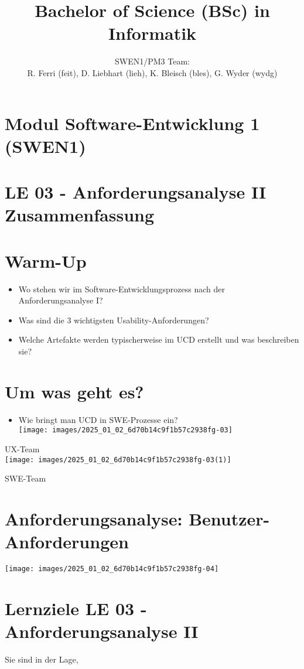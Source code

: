 \documentclass[10pt]{article}
\title{Bachelor of Science (BSc) in Informatik }
\author{SWEN1/PM3 Team:\\
R. Ferri (feit), D. Liebhart (lieh), K. Bleisch (bles), G. Wyder (wydg)}
\date{}
\begin{document}
\maketitle
\section*{Modul Software-Entwicklung 1 (SWEN1) }
\section*{LE 03 - Anforderungsanalyse II Zusammenfassung}


\section*{Warm-Up}
\begin{itemize}
  \item Wo stehen wir im Software-Entwicklungsprozess nach der Anforderungsanalyse I?
  \item Was sind die 3 wichtigsten Usability-Anforderungen?
  \item Welche Artefakte werden typischerweise im UCD erstellt und was beschreiben sie?
\end{itemize}

\section*{Um was geht es?}
\begin{itemize}
  \item Wie bringt man UCD in SWE-Prozesse ein?\\
\texttt{[image: images/2025\_01\_02\_6d70b14c9f1b57c2938fg-03]}
\end{itemize}

UX-Team\\
\texttt{[image: images/2025\_01\_02\_6d70b14c9f1b57c2938fg-03(1)]}

SWE-Team

\section*{Anforderungsanalyse: Benutzer-Anforderungen}
\begin{center}
\texttt{[image: images/2025\_01\_02\_6d70b14c9f1b57c2938fg-04]}
\end{center}

\section*{Lernziele LE 03 - Anforderungsanalyse II}
Sie sind in der Lage,
\end{document}
